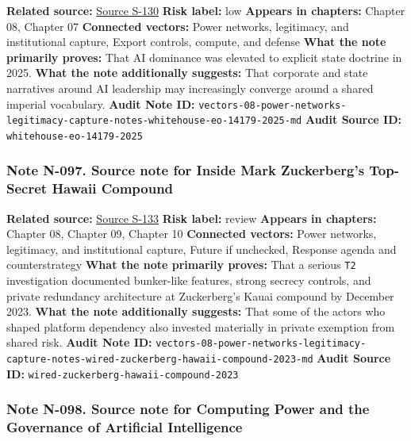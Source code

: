 \documentclass[
  american,
  11pt,
  letterpaper,
]{article}
\begin{document}
\textbf{Related source:}
\hyperref[source-s-130-removing-barriers-to-american-leadership-in-artificial-intelligence]{Source
S-130} \textbf{Risk label:} low \textbf{Appears in chapters:} Chapter
08, Chapter 07 \textbf{Connected vectors:} Power networks, legitimacy,
and institutional capture, Export controls, compute, and defense
\textbf{What the note primarily proves:} That AI dominance was elevated
to explicit state doctrine in 2025. \textbf{What the note additionally
suggests:} That corporate and state narratives around AI leadership may
increasingly converge around a shared imperial vocabulary. \textbf{Audit
Note ID:}
\texttt{vectors-08-power-networks-legitimacy-capture-notes-whitehouse-eo-14179-2025-md}
\textbf{Audit Source ID:} \texttt{whitehouse-eo-14179-2025}

\subsubsection{Note N-097. Source note for Inside Mark Zuckerberg's
Top-Secret Hawaii
Compound}\label{note-n-097-vectors-08-power-networks-legitimacy-capture-notes-wired-zuckerberg-hawaii-compound-2023-md}

\textbf{Related source:}
\hyperref[source-s-133-inside-mark-zuckerbergs-top-secret-hawaii-compound]{Source
S-133} \textbf{Risk label:} review \textbf{Appears in chapters:} Chapter
08, Chapter 09, Chapter 10 \textbf{Connected vectors:} Power networks,
legitimacy, and institutional capture, Future if unchecked, Response
agenda and counterstrategy \textbf{What the note primarily proves:} That
a serious \texttt{T2} investigation documented bunker-like features,
strong secrecy controls, and private redundancy architecture at
Zuckerberg's Kauai compound by December 2023. \textbf{What the note
additionally suggests:} That some of the actors who shaped platform
dependency also invested materially in private exemption from shared
risk. \textbf{Audit Note ID:}
\texttt{vectors-08-power-networks-legitimacy-capture-notes-wired-zuckerberg-hawaii-compound-2023-md}
\textbf{Audit Source ID:} \texttt{wired-zuckerberg-hawaii-compound-2023}

\subsubsection{Note N-098. Source note for Computing Power and the
Governance of Artificial
Intelligence}\label{note-n-098-vectors-09-future-if-unchecked-notes-compute-governance-ai-2024-md}
\end{document}
